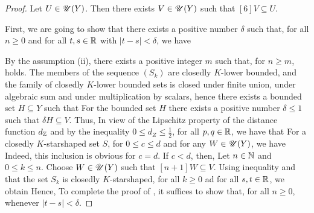 \begin{proof}
Let $U\in\mathscr{U}(Y)$. Then there exists $V\in\mathscr{U}(Y)$ such that $[6]V\subseteq U$. 

First, we are going to show that there exists a positive number $\delta$ such that,
for all $n\geq0$ and for all $t,s\in\mathbb{R}$ with $|t-s|<\delta$, we have

By the assumption (ii), there exists a positive integer $m$ such that, for $n\geq m$,  holds.
The members of the sequence $(S_k)$ are closedly $K$-lower bounded, and the family of closedly $K$-lower
bounded sets is closed under finite union, under algebraic sum and under multiplication by scalars, hence there exists 
a bounded set $H\subseteq Y$ such that 
For the bounded set $H$ there exists a positive number $\delta\leq 1$ such that $\delta H\subseteq V$.
Thus,
In view of the Lipschitz property of the distance function $d_{\mathbb{Z}}$ and by the inequality $0\leq d_Z\leq \frac12$, 
for all $p,q\in\mathbb{R}$, we have that
For a closedly $K$-starshaped set $S$, for $0\leq c\leq d$ and for any $W\in\mathscr{U}(Y)$, we have
Indeed, this inclusion is obvious for $c=d$. If $c<d$, then, 
Let $n\in\mathbb{N}$ and $0\leq k\leq n$. Choose $W\in\mathscr{U}(Y)$ such that $[n+1]W\subseteq V$. 
Using inequality  and that the set $S_k$ is closedly $K$-starshaped, for all $k\geq0$ ad for all 
$s,t\in\mathbb{R}$, we obtain
Hence, 
To complete the proof of , it suffices to show that, for all $n\geq0$,
whenever $|t-s|<\delta$. 


\end{proof}
